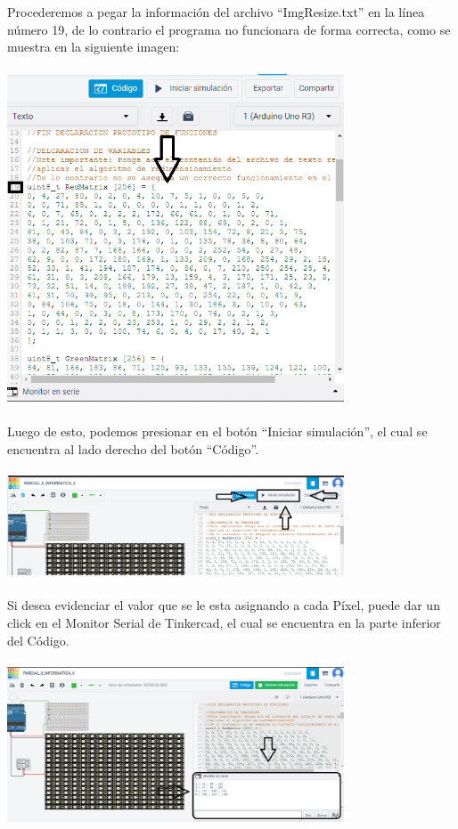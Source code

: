 \documentclass{article}
\begin{document}
\\
\\
Procederemos a pegar la información del archivo “ImgResize.txt” en la línea número 19, de lo contrario el programa no funcionara de forma correcta, como se muestra en la siguiente imagen:
\\
\\
\includegraphics[width=10cm]{matrices.PNG}
\\
\\
Luego de esto, podemos presionar en el botón “Iniciar simulación”, el cual se encuentra al lado derecho del botón “Código”.
\\
\\
\includegraphics[width=10cm]{iniciar_simulacion.PNG}
\\
\\
Si desea evidenciar el valor que se le esta asignando a cada Píxel, puede dar un click en el Monitor Serial de Tinkercad, el cual se encuentra en la parte inferior del Código.
\\
\\
\includegraphics[width=10cm]{monitor_serial.PNG}
\end{document}
